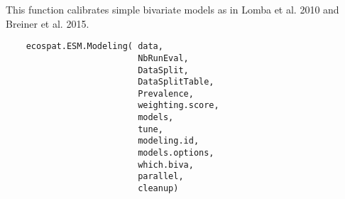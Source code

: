 \documentclass[a4paper]{book}
\begin{document}
%
\begin{Description}\relax
This function calibrates simple bivariate models as in Lomba et al. 2010 and Breiner et al. 2015.
\end{Description}
%
\begin{Usage}
\begin{verbatim}
    ecospat.ESM.Modeling( data, 
                          NbRunEval, 
                          DataSplit, 
                          DataSplitTable, 
                          Prevalence,
                          weighting.score, 
                          models, 
                          tune,
                          modeling.id, 
                          models.options, 
                          which.biva, 
                          parallel, 
                          cleanup)
\end{verbatim}
\end{Usage}
%
\end{document}
